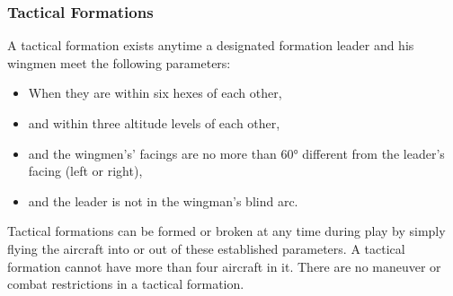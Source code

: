 \subsubsection{Tactical Formations}

A tactical formation exists anytime a designated formation leader and his wingmen meet the following parameters:

\begin{itemize}
    \item When they are within six hexes of each other,
    \item and within three altitude levels of each other,
    \item and the wingmen’s' facings are no more than 60° different from the leader's facing (left or right),
    \item and the leader is not in the wingman's blind arc.
\end{itemize}

Tactical formations can be formed or broken at any time during play by simply flying the aircraft into or out of these established parameters. A tactical formation cannot have more than four aircraft in it. There are no maneuver or combat restrictions in a tactical formation.
